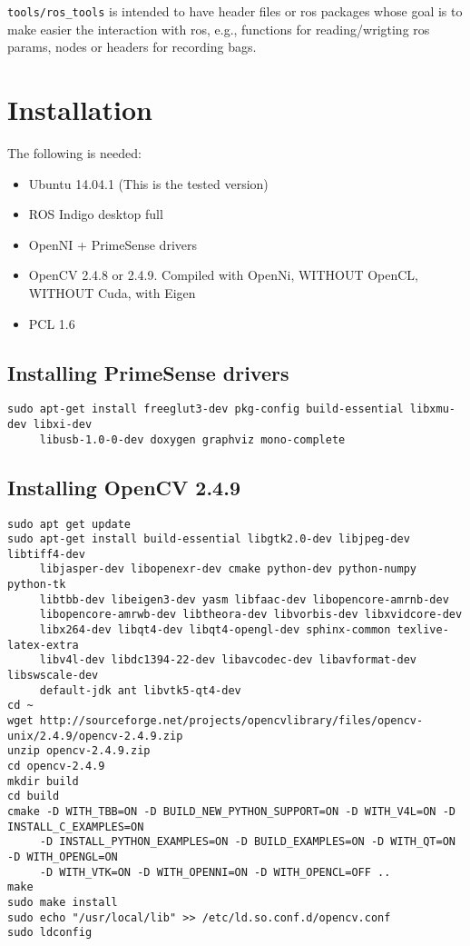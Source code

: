 \documentclass[letterpaper,10pt]{article}
\begin{document}
\texttt{tools/ros\_tools} is intended to have header files or ros packages whose goal is to make easier the interaction with ros, e.g., functions for reading/wrigting ros params, nodes or headers for recording bags. 

\section{Installation}

The following is needed:
\begin{itemize}
\item Ubuntu 14.04.1 (This is the tested version)
\item ROS Indigo desktop full
\item OpenNI + PrimeSense drivers
\item OpenCV 2.4.8 or 2.4.9. Compiled with OpenNi, WITHOUT OpenCL, WITHOUT Cuda, with Eigen
\item PCL 1.6
\end{itemize}

\subsection{Installing PrimeSense drivers}
\begin{verbatim}
sudo apt-get install freeglut3-dev pkg-config build-essential libxmu-dev libxi-dev 
     libusb-1.0-0-dev doxygen graphviz mono-complete

\end{verbatim}

\subsection{Installing OpenCV 2.4.9}
\begin{verbatim}
sudo apt get update
sudo apt-get install build-essential libgtk2.0-dev libjpeg-dev libtiff4-dev 
     libjasper-dev libopenexr-dev cmake python-dev python-numpy python-tk 
     libtbb-dev libeigen3-dev yasm libfaac-dev libopencore-amrnb-dev 
     libopencore-amrwb-dev libtheora-dev libvorbis-dev libxvidcore-dev 
     libx264-dev libqt4-dev libqt4-opengl-dev sphinx-common texlive-latex-extra 
     libv4l-dev libdc1394-22-dev libavcodec-dev libavformat-dev libswscale-dev 
     default-jdk ant libvtk5-qt4-dev
cd ~
wget http://sourceforge.net/projects/opencvlibrary/files/opencv-unix/2.4.9/opencv-2.4.9.zip
unzip opencv-2.4.9.zip
cd opencv-2.4.9
mkdir build
cd build
cmake -D WITH_TBB=ON -D BUILD_NEW_PYTHON_SUPPORT=ON -D WITH_V4L=ON -D INSTALL_C_EXAMPLES=ON 
     -D INSTALL_PYTHON_EXAMPLES=ON -D BUILD_EXAMPLES=ON -D WITH_QT=ON -D WITH_OPENGL=ON 
     -D WITH_VTK=ON -D WITH_OPENNI=ON -D WITH_OPENCL=OFF ..
make
sudo make install
sudo echo "/usr/local/lib" >> /etc/ld.so.conf.d/opencv.conf
sudo ldconfig
\end{verbatim}
\end{document}
